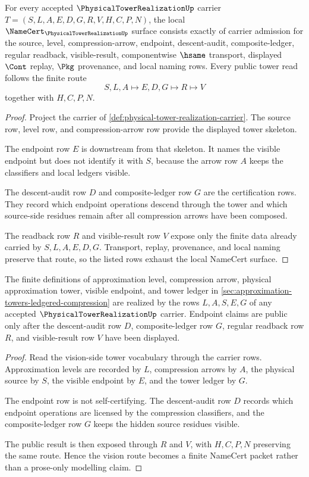 \begin{theorem}
\label{thm:physical-tower-realization-namecert-obligations}
For every accepted $\PhysicalTowerRealizationUp$ carrier $T=(S,L,A,E,D,G,R,V,H,C,P,N)$, the local $\NameCert_{\PhysicalTowerRealizationUp}$ surface consists exactly of carrier admission for the source, level, compression-arrow, endpoint, descent-audit, composite-ledger, regular readback, visible-result, componentwise $\hsame$ transport, displayed $\Cont$ replay, $\Pkg$ provenance, and local naming rows. Every public tower read follows the finite route
$$
S,L,A \longmapsto E,D,G \longmapsto R \longmapsto V
$$
together with $H,C,P,N$.
\end{theorem}
\begin{proof}
Project the carrier of \autoref{def:physical-tower-realization-carrier}. The source row, level row, and compression-arrow row provide the displayed tower skeleton.

The endpoint row $E$ is downstream from that skeleton. It names the visible endpoint but does not identify it with $S$, because the arrow row $A$ keeps the classifiers and local ledgers visible.

The descent-audit row $D$ and composite-ledger row $G$ are the certification rows. They record which endpoint operations descend through the tower and which source-side residues remain after all compression arrows have been composed.

The readback row $R$ and visible-result row $V$ expose only the finite data already carried by $S,L,A,E,D,G$. Transport, replay, provenance, and local naming preserve that route, so the listed rows exhaust the local NameCert surface.
\end{proof}

\begin{theorem}
\label{thm:physical-tower-realization-vision-handoff}
The finite definitions of approximation level, compression arrow, physical approximation tower, visible endpoint, and tower ledger in \autoref{sec:approximation-towers-ledgered-compression} are realized by the rows $L,A,S,E,G$ of any accepted $\PhysicalTowerRealizationUp$ carrier. Endpoint claims are public only after the descent-audit row $D$, composite-ledger row $G$, regular readback row $R$, and visible-result row $V$ have been displayed.
\end{theorem}
\begin{proof}
Read the vision-side tower vocabulary through the carrier rows. Approximation levels are recorded by $L$, compression arrows by $A$, the physical source by $S$, the visible endpoint by $E$, and the tower ledger by $G$.

The endpoint row is not self-certifying. The descent-audit row $D$ records which endpoint operations are licensed by the compression classifiers, and the composite-ledger row $G$ keeps the hidden source residues visible.

The public result is then exposed through $R$ and $V$, with $H,C,P,N$ preserving the same route. Hence the vision route becomes a finite NameCert packet rather than a prose-only modelling claim.
\end{proof}

